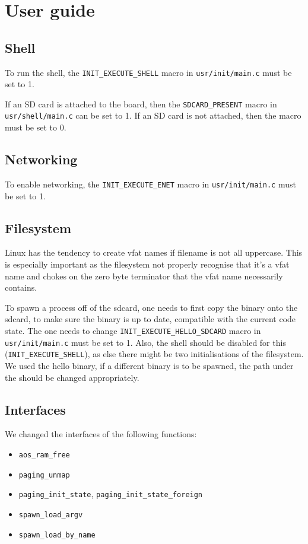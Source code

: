 \chapter{User guide}

\section{Shell}

To run the shell, the \verb|INIT_EXECUTE_SHELL| macro in \verb|usr/init/main.c| must be set to 1.

If an SD card is attached to the board, then the \verb|SDCARD_PRESENT| macro in \verb|usr/shell/main.c| can be set to 1.
If an SD card is not attached, then the macro must be set to 0.

\section{Networking}

To enable networking, the \verb|INIT_EXECUTE_ENET| macro in \verb|usr/init/main.c| must be set to 1.

\section{Filesystem}

Linux has the tendency to create vfat names if filename is not all uppercase.
This is especially important as the filesystem not properly recognise that it's
a vfat name and chokes on the zero byte terminator that the vfat name
necessarily contains.

To spawn a process off of the sdcard, one needs to first copy the binary onto
the sdcard, to make sure the binary is up to date, compatible with the current
code state.
The one needs to change \verb|INIT_EXECUTE_HELLO_SDCARD| macro in
\verb|usr/init/main.c| must be set to 1.
Also, the shell should be disabled for this (\verb|INIT_EXECUTE_SHELL|), as else
there might be two initialisations of the filesystem.
We used the hello binary, if a different binary is to be spawned, the path
under the should be changed appropriately.

\section{Interfaces}

We changed the interfaces of the following functions:

\begin{itemize}
    \item \verb|aos_ram_free|
    \item \verb|paging_unmap|
    \item \verb|paging_init_state|, \verb|paging_init_state_foreign|
    \item \verb|spawn_load_argv|
    \item \verb|spawn_load_by_name|
\end{itemize}

